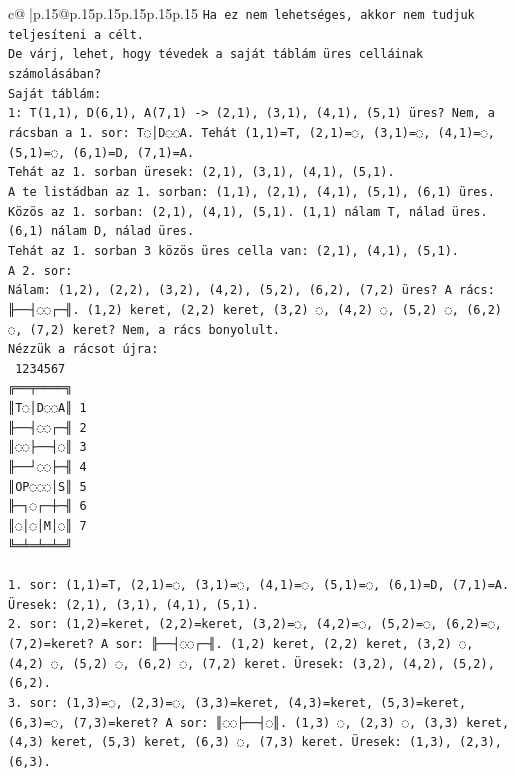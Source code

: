 \documentclass{article}
\begin{document}
{\begin{supertabular}{c@{$\;$}|p{.15\linewidth}@{}p{.15\linewidth}p{.15\linewidth}p{.15\linewidth}p{.15\linewidth}p{.15\linewidth}}
{{{\texttt{Ha ez nem lehetséges, akkor nem tudjuk teljesíteni a célt.} \\
\texttt{De várj, lehet, hogy tévedek a saját táblám üres celláinak számolásában?} \\
\texttt{Saját táblám:} \\
\texttt{1: T(1,1), D(6,1), A(7,1) {-}> (2,1), (3,1), (4,1), (5,1) üres? Nem, a rácsban a 1. sor: T◌│D◌◌A. Tehát (1,1)=T, (2,1)=◌, (3,1)=◌, (4,1)=◌, (5,1)=◌, (6,1)=D, (7,1)=A.} \\
\texttt{Tehát az 1. sorban üresek: (2,1), (3,1), (4,1), (5,1).} \\
\texttt{A te listádban az 1. sorban: (1,1), (2,1), (4,1), (5,1), (6,1) üres.} \\
\texttt{Közös az 1. sorban: (2,1), (4,1), (5,1). (1,1) nálam T, nálad üres. (6,1) nálam D, nálad üres.} \\
\texttt{Tehát az 1. sorban 3 közös üres cella van: (2,1), (4,1), (5,1).} \\
\texttt{A 2. sor:} \\
\texttt{Nálam: (1,2), (2,2), (3,2), (4,2), (5,2), (6,2), (7,2) üres? A rács: ╟──┤◌◌┌─╢. (1,2) keret, (2,2) keret, (3,2) ◌, (4,2) ◌, (5,2) ◌, (6,2) ◌, (7,2) keret? Nem, a rács bonyolult.} \\
\texttt{Nézzük a rácsot újra:} \\
\texttt{ 1234567} \\
\texttt{╔══╤════╗} \\
\texttt{║T◌│D◌◌A║ 1} \\
\texttt{╟──┤◌◌┌─╢ 2} \\
\texttt{║◌◌├──┤◌║ 3} \\
\texttt{╟──┘◌◌├─╢ 4} \\
\texttt{║OP◌◌◌│S║ 5} \\
\texttt{╟─┐◌┌─┼─╢ 6} \\
\texttt{║◌│◌│M│◌║ 7} \\
\texttt{╚═╧═╧═╧═╝} \\
\\ 
\texttt{1. sor: (1,1)=T, (2,1)=◌, (3,1)=◌, (4,1)=◌, (5,1)=◌, (6,1)=D, (7,1)=A. Üresek: (2,1), (3,1), (4,1), (5,1).} \\
\texttt{2. sor: (1,2)=keret, (2,2)=keret, (3,2)=◌, (4,2)=◌, (5,2)=◌, (6,2)=◌, (7,2)=keret? A sor: ╟──┤◌◌┌─╢. (1,2) keret, (2,2) keret, (3,2) ◌, (4,2) ◌, (5,2) ◌, (6,2) ◌, (7,2) keret. Üresek: (3,2), (4,2), (5,2), (6,2).} \\
\texttt{3. sor: (1,3)=◌, (2,3)=◌, (3,3)=keret, (4,3)=keret, (5,3)=keret, (6,3)=◌, (7,3)=keret? A sor: ║◌◌├──┤◌║. (1,3) ◌, (2,3) ◌, (3,3) keret, (4,3) keret, (5,3) keret, (6,3) ◌, (7,3) keret. Üresek: (1,3), (2,3), (6,3).} \\
}}}
\end{supertabular}}
\end{document}
